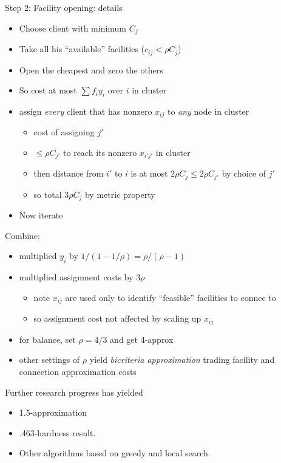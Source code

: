 \documentclass{article}
\begin{document}
Step 2: Facility opening: details
\begin{itemize}
\item Choose client with minimum $C_j$
\item Take all his ``available'' facilities ($c_{ij} < \rho C_j$)
\item Open the cheapest and zero the others
\item So cost at most $\sum f_i y_i$ over $i$ in cluster
\item assign \emph{every} client that has nonzero $x_{ij}$ to
  \emph{any} node in cluster
\begin{itemize}
\item cost of assigning $j'$
\item $\le \rho C_{j'}$ to reach its nonzero $x_{i'j'}$ in cluster
\item then distance from $i'$ to $i$ is at most $2\rho C_j \le 2\rho C_{j'}$ 
by  choice of $j'$
\item so total $3\rho C_j$ by metric property
\end{itemize}
\item Now iterate
\end{itemize}

Combine: 
\begin{itemize}
\item multiplied $y_i$ by $1/(1-1/\rho)=\rho/(\rho-1)$
\item multiplied assignment costs by $3\rho$ 
\begin{itemize}
\item note $x_{ij}$ are used only to
  identify ``feasible'' facilities to connec to
\item so assignment cost not affected by scaling up $x_{ij}$ 
\end{itemize}
\item for balance, set  $\rho=4/3$ and get 4-approx
\item other settings of $\rho$ yield \emph{bicriteria approximation}
  trading facility and connection approximation costs
\end{itemize}

Further research progress has yielded
\begin{itemize}
\item 1.5-approximation 
\item .463-hardness result.  
\item Other algorithms based on greedy and local search.
\end{itemize}
\end{document}
